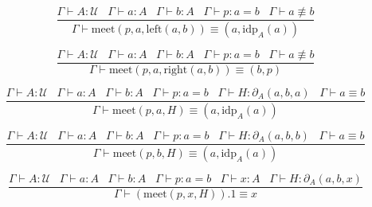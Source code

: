 \documentclass[a4paper,UKenglish,cleveref, autoref, thm-restate]{lipics-v2021}
\newcommand{\UU}{\ensuremath{\mathcal{U}}}
\begin{document}
\begin{equation*}
    \frac{\Gamma \vdash A : \UU \hspace{10pt} \Gamma \vdash a : A \hspace{10pt} \Gamma \vdash b : A \hspace{10pt} \Gamma \vdash p : a = b \hspace{10pt} \Gamma \vdash a \not\equiv b}{\Gamma \vdash \mathrm{meet}(p, a, \mathrm{left}(a, b)) \equiv (a, \mathrm{idp}_A(a))}
\end{equation*}

\begin{equation*}
    \frac{\Gamma \vdash A : \UU \hspace{10pt} \Gamma \vdash a : A \hspace{10pt} \Gamma \vdash b : A \hspace{10pt} \Gamma \vdash p : a = b \hspace{10pt} \Gamma \vdash a \not\equiv b}{\Gamma \vdash \mathrm{meet}(p, a, \mathrm{right}(a, b)) \equiv (b, p)}
\end{equation*}

\begin{equation*}
    \frac{\Gamma \vdash A : \UU \hspace{10pt} \Gamma \vdash a : A \hspace{10pt} \Gamma \vdash b : A \hspace{10pt} \Gamma \vdash p : a = b \hspace{10pt} \Gamma \vdash H : \partial_A(a, b, a) \hspace{10pt} \Gamma \vdash a \equiv b}{\Gamma \vdash \mathrm{meet}(p, a, H) \equiv (a, \mathrm{idp}_A(a))}
\end{equation*}

\begin{equation*}
    \frac{\Gamma \vdash A : \UU \hspace{10pt} \Gamma \vdash a : A \hspace{10pt} \Gamma \vdash b : A \hspace{10pt} \Gamma \vdash p : a = b \hspace{10pt} \Gamma \vdash H : \partial_A(a, b, b) \hspace{10pt} \Gamma \vdash a \equiv b}{\Gamma \vdash \mathrm{meet}(p, b, H) \equiv (a, \mathrm{idp}_A(a))}
\end{equation*}

\begin{equation*}
    \frac{\Gamma \vdash A : \UU \hspace{10pt} \Gamma \vdash a : A \hspace{10pt} \Gamma \vdash b : A \hspace{10pt} \Gamma \vdash p : a = b \hspace{10pt} \Gamma \vdash x : A \hspace{10pt} \Gamma \vdash H : \partial_A(a, b, x)}{\Gamma \vdash (\mathrm{meet}(p, x, H)).1 \equiv x}
\end{equation*}
\end{document}

